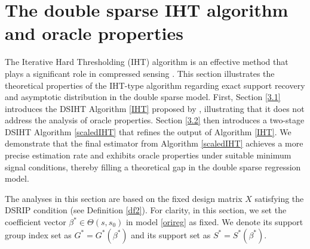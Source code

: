 \documentclass[12pt]{article}
\begin{document}
\section{The double sparse IHT algorithm and oracle properties}\label{sec:scaled}
The Iterative Hard Thresholding (IHT) algorithm is an effective method that plays a significant role in compressed sensing \cite{BLUMENSATH2009265, jain2014iterative, yuan18grad, liubarber19}. 
This section illustrates the theoretical properties of the IHT-type algorithm regarding exact support recovery and asymptotic distribution in the double sparse model.
First, Section \ref{3.1} introduces the DSIHT Algorithm \ref{IHT} proposed by \cite{ZL23}, illustrating that it does not address the analysis of oracle properties. 
Section \ref{3.2} then introduces a two-stage DSIHT Algorithm \ref{scaledIHT} that refines the output of Algorithm \ref{IHT}. 
We demonstrate that the final estimator from Algorithm \ref{scaledIHT} achieves a more precise estimation rate and exhibits oracle properties under suitable minimum signal conditions, thereby filling a theoretical gap in the double sparse regression model.

The analyses in this section are based on the fixed design matrix $X$ satisfying the DSRIP condition (see Definition \ref{df2}).
For clarity, in this section, we set the coefficient vector $\beta^* \in {\Theta}(s,s_0)$ in model \eqref{orireg} as fixed.
We denote its support group index set as $G^*=G^*(\beta^*)$ and its support set as $S^*= S^*(\beta^*)$.
\end{document}
